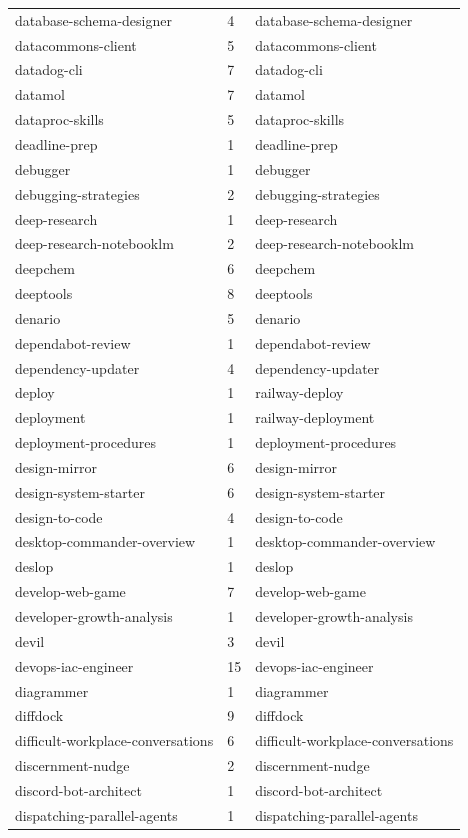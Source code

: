 \begin{longtable}{@{}lll@{}}
database-schema-designer & 4 & database-schema-designer\\
datacommons-client & 5 & datacommons-client\\
datadog-cli & 7 & datadog-cli\\
datamol & 7 & datamol\\
dataproc-skills & 5 & dataproc-skills\\
deadline-prep & 1 & deadline-prep\\
debugger & 1 & debugger\\
debugging-strategies & 2 & debugging-strategies\\
deep-research & 1 & deep-research\\
deep-research-notebooklm & 2 & deep-research-notebooklm\\
deepchem & 6 & deepchem\\
deeptools & 8 & deeptools\\
denario & 5 & denario\\
dependabot-review & 1 & dependabot-review\\
dependency-updater & 4 & dependency-updater\\
deploy & 1 & railway-deploy\\
deployment & 1 & railway-deployment\\
deployment-procedures & 1 & deployment-procedures\\
design-mirror & 6 & design-mirror\\
design-system-starter & 6 & design-system-starter\\
design-to-code & 4 & design-to-code\\
desktop-commander-overview & 1 & desktop-commander-overview\\
deslop & 1 & deslop\\
develop-web-game & 7 & develop-web-game\\
developer-growth-analysis & 1 & developer-growth-analysis\\
devil & 3 & devil\\
devops-iac-engineer & 15 & devops-iac-engineer\\
diagrammer & 1 & diagrammer\\
diffdock & 9 & diffdock\\
difficult-workplace-conversations & 6 & difficult-workplace-conversations\\
discernment-nudge & 2 & discernment-nudge\\
discord-bot-architect & 1 & discord-bot-architect\\
dispatching-parallel-agents & 1 & dispatching-parallel-agents\\

\end{longtable}
